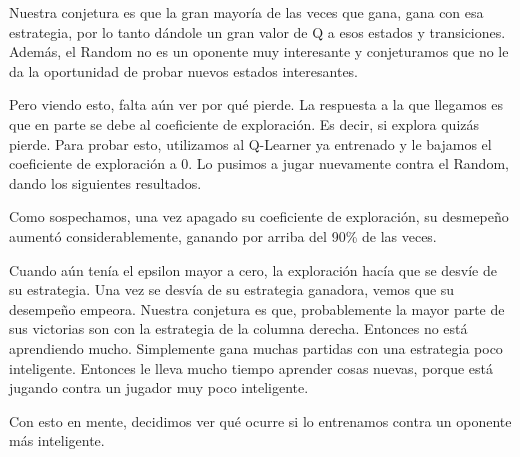 Nuestra conjetura es que la gran mayoría de las veces que gana, gana con esa estrategia, por lo tanto dándole un gran valor de Q a esos estados y transiciones. Además, el Random no es un oponente muy interesante y conjeturamos que no le da la oportunidad de probar nuevos estados interesantes.

Pero viendo esto, falta aún ver por qué pierde. La respuesta a la que llegamos es que en parte se debe al coeficiente de exploración. Es decir, si explora quizás pierde. Para probar esto, utilizamos al Q-Learner ya entrenado y le bajamos el coeficiente de exploración a 0. Lo pusimos a jugar nuevamente contra el Random, dando los siguientes resultados.



Como sospechamos, una vez apagado su coeficiente de exploración, su desmepeño aumentó considerablemente, ganando por arriba del 90\% de las veces.

Cuando aún tenía el epsilon mayor a cero, la exploración hacía que se desvíe de su estrategia. Una vez se desvía de su estrategia ganadora, vemos que su desempeño empeora. Nuestra conjetura es que, probablemente la mayor parte de sus victorias son con la estrategia de la columna derecha. Entonces no está aprendiendo mucho. Simplemente gana muchas partidas con una estrategia poco inteligente. Entonces le lleva mucho tiempo aprender cosas nuevas, porque está jugando contra un jugador muy poco inteligente.

Con esto en mente, decidimos ver qué ocurre si lo entrenamos contra un oponente más inteligente.
